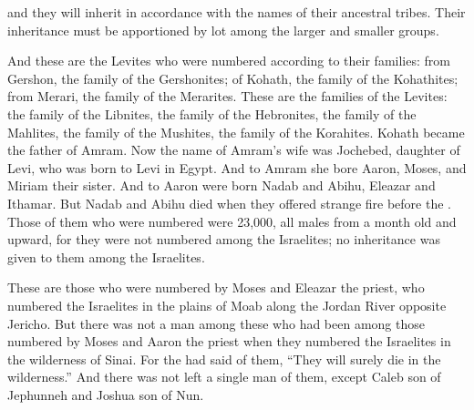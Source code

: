 {and they will inherit
in accordance with the names
of their ancestral
tribes.
Their inheritance
must be apportioned
by lot
among
the larger
and smaller groups.
\par }{\PP {}And these
are the Levites
who were numbered
according to their families: from Gershon,
the family
of the Gershonites;
of Kohath,
the family
of the Kohathites;
from Merari,
the family
of the Merarites.
These
are the families
of the Levites: the family
of the Libnites,
the family
of the Hebronites,
the family
of the Mahlites,
the family
of the Mushites,
the family
of the Korahites.
Kohath
became the father
of Amram.
Now the name
of Amram’s
wife
was Jochebed,
daughter
of Levi,
who
was born
to Levi
in Egypt.
And to Amram
she bore
Aaron,
Moses,
and Miriam
their sister.
And to Aaron
were born
Nadab
and Abihu,
Eleazar
and Ithamar.
But Nadab
and Abihu
died
when they offered
strange
fire
before
the {}.
Those of them who were
numbered
were 23,000,
all
males
from a month
old and upward,
for
they were not
numbered
among
the Israelites;
no
inheritance
was given
to them
among
the Israelites.
\par }{\PP {}These
are those who were numbered
by Moses
and Eleazar
the priest,
who
numbered
the Israelites
in the plains
of Moab
along the Jordan River
opposite Jericho.
But there was not
a man
among
these
who had
been among those
numbered by
Moses
and Aaron
the priest
when they numbered
the Israelites
in the wilderness
of Sinai.
For
the {}
had said
of them, “They will surely
die
in the wilderness.”
And there was not
left
a single
man
of them,
except
Caleb
son
of Jephunneh
and Joshua
son
of Nun.

}
